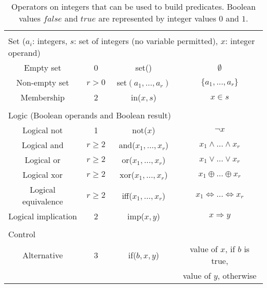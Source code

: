 \documentclass[10pt]{article}
\newcommand{\nm}[1]{\mathit{#1}} %
\begin{document}
\begin{table}[h!]
\begin{center}
{\begin{tabular}{cccc}
\midrule
\multicolumn{2}{c}{ } \\
\multicolumn{4}{l}{\textcolor{dred}{Set ($a_i$: integers, $s$: set of integers (no variable permitted), $x$: integer operand)}} \\
\midrule
Empty set & 0 & set() & $\emptyset$ \\
Non-empty set & $r > 0$ & set$(a_1,\ldots,a_r)$ & $\{a_1,\ldots,a_r\}$ \\
Membership & 2 & in($x,s$) & $x \in s$ \\
\midrule
\multicolumn{2}{c}{ } \\
\multicolumn{4}{l}{\textcolor{dred}{Logic (Boolean operands and Boolean result)}} \\
\midrule
Logical not     & 1 & not($x$) & $\lnot x$ \\
Logical and    & $r \geq 2$ &  and($x_1,\ldots,x_r$) & $x_1 \land \ldots \land x_r$ \\
Logical or    & $r \geq 2$ & or($x_1,\ldots,x_r$) & $x_1 \lor \ldots \lor x_r$ \\
Logical xor    & $r \geq 2$ & xor($x_1,\ldots,x_r$) & $x_1 \oplus \ldots \oplus x_r$ \\
Logical equivalence& $r \geq 2$ & iff($x_1,\ldots,x_r$) & $x_1 \Leftrightarrow \ldots \Leftrightarrow x_r$ \\
Logical implication & 2 & imp($x,y$) & $x \Rightarrow y$ \\
\midrule
\multicolumn{2}{c}{ } \\
\multicolumn{4}{l}{\textcolor{dred}{Control}} \\
\midrule
Alternative     & 3 & if($b,x,y$) & value of $x$, if $b$ is true, \\
                &   &           & value of $y$, otherwise     \\
\bottomrule
\end{tabular}
}
\end{center}
\caption{Operators on integers that can be used to build predicates. Boolean values $\nm{false}$ and $\nm{true}$ are represented by integer values $0$ and $1$.%
\label{tab:semanticsi}}
\end{table}
\end{document}
